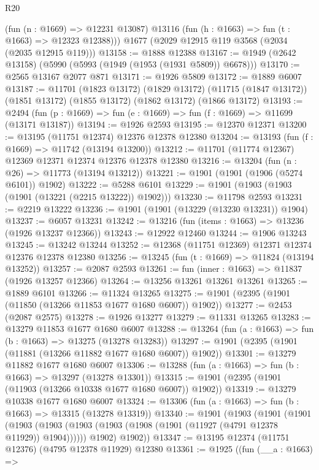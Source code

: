 \begin{lexlean}{R20}
\begin{coremodule}
        (fun (n : @1669) => @12231 @13087)
        @13116
        (fun (h : @1663) => fun (t : @1663) => @12323 @12388)))
    @1677
    (@2029 @12915 @119 @3568 (@2034 (@2035 @12915 @119)))
@13158 := @1888 @12388
@13167 := @1949 (@2642 @13158) (@5990 (@5993 (@1949 (@1953 (@1931 @5809)) @6678)))
@13170 := @2565 @13167 @2077 @871
@13171 := @1926 @5809
@13172 := @1889 @6007
@13187 := @11701
    (@1823 @13172)
    (@1829 @13172)
    (@11715 (@1847 @13172))
    (@1851 @13172)
    (@1855 @13172)
    (@1862 @13172)
    (@1866 @13172)
@13193 := @2494 (fun (p : @1669) => fun (e : @1669) => fun (f : @1669) => @11699 (@13171 @13187))
@13194 := @1926 @2593
@13195 := @12370 @12371
@13200 := @13195 (@11751 @12374) @12376 @12378 @12380
@13204 := @13193 (fun (f : @1669) => @11742 (@13194 @13200))
@13212 := @11701 (@11774 @12367) @12369 @12371 @12374 @12376 @12378 @12380
@13216 := @13204 (fun (n : @26) => @11773 (@13194 @13212))
@13221 := @1901 (@1901 (@1906 (@5274 @6101)) @1902)
@13222 := @5288 @6101
@13229 := @1901 (@1903 (@1903 (@1901 (@13221 (@2215 @13222)) @1902)))
@13230 := @11798 @2593
@13231 := @2219 @13222
@13236 := @1901 (@1901 (@13229 (@13230 @13231)) @1904)
@13237 := @6057 @13231
@13242 := @13216 (fun (items : @1663) => @13236 (@1926 @13237 @12366))
@13243 := @12922 @12460
@13244 := @1906 @13243
@13245 := @13242 @13244
@13252 := @12368 (@11751 @12369) @12371 @12374 @12376 @12378 @12380
@13256 := @13245 (fun (t : @1669) => @11824 (@13194 @13252))
@13257 := @2087 @2593
@13261 := fun (inner : @1663) => @11837 (@1926 @13257 @12366)
@13264 := @13256 @13261 @13261 @13261
@13265 := @1889 @6101
@13266 := @11324 @13265
@13275 := @1901 (@2395 (@1901 (@11850 (@13266 @11853 @1677 @1680 @6007)) @1902))
@13277 := @2453 (@2087 @2575)
@13278 := @1926 @13277
@13279 := @11331 @13265
@13283 := @13279 @11853 @1677 @1680 @6007
@13288 := @13264 (fun (a : @1663) => fun (b : @1663) => @13275 (@13278 @13283))
@13297 := @1901 (@2395 (@1901 (@11881 (@13266 @11882 @1677 @1680 @6007)) @1902))
@13301 := @13279 @11882 @1677 @1680 @6007
@13306 := @13288 (fun (a : @1663) => fun (b : @1663) => @13297 (@13278 @13301))
@13315 := @1901 (@2395 (@1901 (@11903 (@13266 @10338 @1677 @1680 @6007)) @1902))
@13319 := @13279 @10338 @1677 @1680 @6007
@13324 := @13306 (fun (a : @1663) => fun (b : @1663) => @13315 (@13278 @13319))
@13340 := @1901
    (@1903
      (@1901
        (@1901
          (@1903 (@1903 (@1903 (@1903 (@1908 (@1901 (@11927 (@4791 @12378 @11929)) @1904))))))
          @1902)
        @1902))
@13347 := @13195 @12374 (@11751 @12376) (@4795 @12378 @11929) @12380
@13361 := @1925
    ((fun (__a : @1663) =>

\end{coremodule}
\end{lexlean}
